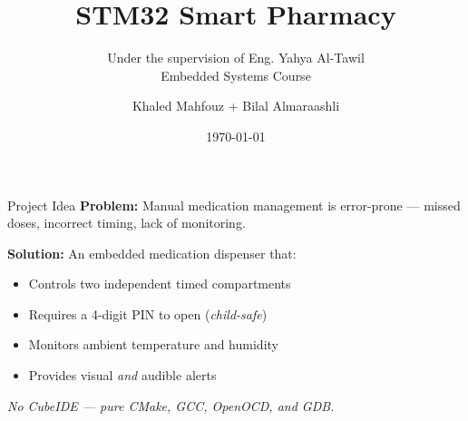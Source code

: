 \documentclass[10pt]{beamer}
\title[Smart Pharmacy]{STM32 Smart Pharmacy}
\subtitle{Under the supervision of Eng. Yahya Al-Tawil \\ Embedded Systems Course}
\author{Khaled Mahfouz + Bilal Almaraashli}
\institute{Damascus University CAE}
\date{\today}
\begin{document}
\begin{frame}
    \titlepage
\end{frame}

\begin{frame}{Project Idea}
    \textbf{Problem:} Manual medication management is error-prone --- missed doses,
    incorrect timing, lack of monitoring.

    \vfill
    \textbf{Solution:} An embedded medication dispenser that:
    \begin{itemize}
        \item Controls two independent timed compartments
        \item Requires a 4-digit PIN to open (\emph{child-safe})
        \item Monitors ambient temperature and humidity
        \item Provides visual \emph{and} audible alerts
    \end{itemize}

    \vfill
    \centering
    \emph{No CubeIDE --- pure CMake, GCC, OpenOCD, and GDB.}
\end{frame}
\end{document}
